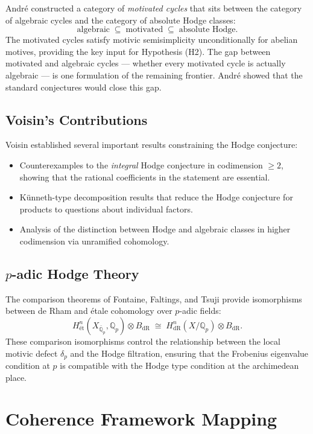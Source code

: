 \documentclass[11pt]{article}
\theoremstyle{definition}
\begin{document}
Andr\'e \cite{Andre} constructed a category of \emph{motivated cycles} that
sits between the category of algebraic cycles and the category of absolute
Hodge classes:
\[
  \text{algebraic} \;\subseteq\; \text{motivated} \;\subseteq\; \text{absolute Hodge}.
\]
The motivated cycles satisfy motivic semisimplicity unconditionally for
abelian motives, providing the key input for Hypothesis (H2).  The gap
between motivated and algebraic cycles --- whether every motivated cycle
is actually algebraic --- is one formulation of the remaining frontier.
Andr\'e showed that the standard conjectures would close this gap.

\subsection{Voisin's Contributions}

Voisin \cite{Voisin} established several important results constraining
the Hodge conjecture:
\begin{itemize}
  \item Counterexamples to the \emph{integral} Hodge conjecture in
    codimension $\geq 2$, showing that the rational coefficients in the
    statement are essential.
  \item K\"unneth-type decomposition results that reduce the Hodge
    conjecture for products to questions about individual factors.
  \item Analysis of the distinction between Hodge and algebraic classes
    in higher codimension via unramified cohomology.
\end{itemize}

\subsection{$p$-adic Hodge Theory}

The comparison theorems of Fontaine, Faltings, and Tsuji provide
isomorphisms between de Rham and \'etale cohomology over $p$-adic fields:
\[
  H^n_{\text{\'et}}(X_{\bar{\mathbb{Q}}_p}, \mathbb{Q}_p) \otimes B_{\mathrm{dR}}
  \;\cong\;
  H^n_{\mathrm{dR}}(X/\mathbb{Q}_p) \otimes B_{\mathrm{dR}}.
\]
These comparison isomorphisms control the relationship between the local
motivic defect $\delta_p$ and the Hodge filtration, ensuring that the
Frobenius eigenvalue condition at $p$ is compatible with the Hodge type
condition at the archimedean place.

\section{Coherence Framework Mapping}
\label{sec:framework}
\end{document}
